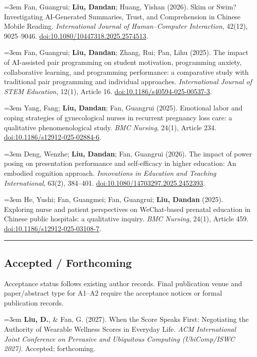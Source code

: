 \documentclass[a4paper,11pt]{article}
\newcommand{\hsep}{\noindent\textcolor{teal}{\rule{\textwidth}{0.5pt}}}
\newcommand{\block}[1]{\par\addvspace{7pt}\Needspace{5\baselineskip}\hsep\vspace{-8pt}\subsection*{#1}}
\newcommand{\publication}[2]{%
  \par\addvspace{8pt}\noindent
  \begin{minipage}{\linewidth}
    \fontsize{10.8}{13.4}\selectfont\raggedright
    \hangindent=3em\hangafter=1
    \makebox[3em][l]{\textcolor{teal}{[#1]}}#2
  \end{minipage}\par}
\begin{document}
\publication{J8}{Fan, Guangrui; \textbf{Liu, Dandan}; Huang, Yishan (2026). Skim or Swim? Investigating AI-Generated Summaries, Trust, and Comprehension in Chinese Mobile Reading. \emph{International Journal of Human--Computer Interaction}, 42(12), 9025--9046. \href{https://doi.org/10.1080/10447318.2025.2574513}{doi:10.1080/10447318.2025.2574513}.}

\publication{J9}{Fan, Guangrui; \textbf{Liu, Dandan}; Zhang, Rui; Pan, Lihu (2025). The impact of AI-assisted pair programming on student motivation, programming anxiety, collaborative learning, and programming performance: a comparative study with traditional pair programming and individual approaches. \emph{International Journal of STEM Education}, 12(1), Article 16. \href{https://doi.org/10.1186/s40594-025-00537-3}{doi:10.1186/s40594-025-00537-3}.}

\publication{J10}{Yang, Fang; \textbf{Liu, Dandan}; Fan, Guangrui (2025). Emotional labor and coping strategies of gynecological nurses in recurrent pregnancy loss care: a qualitative phenomenological study. \emph{BMC Nursing}, 24(1), Article 234. \href{https://doi.org/10.1186/s12912-025-02884-6}{doi:10.1186/s12912-025-02884-6}.}

\publication{J11}{Deng, Wenzhe; \textbf{Liu, Dandan}; Fan, Guangrui (2026). The impact of power posing on presentation performance and self-efficacy in higher education: An embodied cognition approach. \emph{Innovations in Education and Teaching International}, 63(2), 384--401. \href{https://doi.org/10.1080/14703297.2025.2452393}{doi:10.1080/14703297.2025.2452393}.}

\publication{J12}{He, Yushi; Fan, Guangmei; Fan, Guangrui; \textbf{Liu, Dandan} (2025). Exploring nurse and patient perspectives on WeChat-based prenatal education in Chinese public hospitals: a qualitative inquiry. \emph{BMC Nursing}, 24(1), Article 459. \href{https://doi.org/10.1186/s12912-025-03108-7}{doi:10.1186/s12912-025-03108-7}.}


\block{Accepted / Forthcoming}
{\small Acceptance status follows existing author records. Final publication venue and paper/abstract type for A1--A2 require the acceptance notices or formal publication records.}\par
\publication{A1}{\textbf{Liu, D.}, \& Fan, G. (2027). When the Score Speaks First: Negotiating the Authority of Wearable Wellness Scores in Everyday Life. \emph{ACM International Joint Conference on Pervasive and Ubiquitous Computing (UbiComp/ISWC 2027)}. Accepted; forthcoming.}
\end{document}
